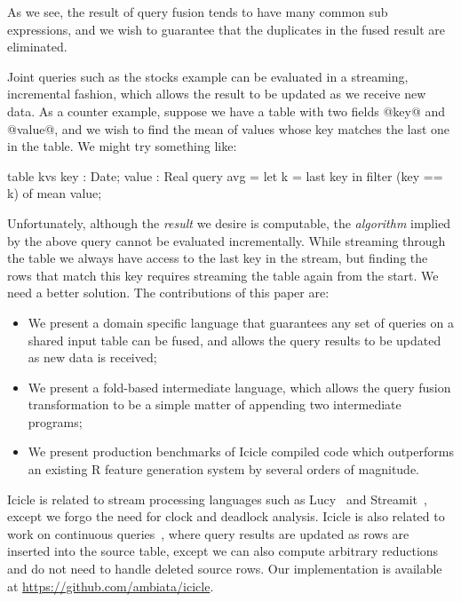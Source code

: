 As we see, the result of query fusion tends to have many common sub expressions, and we wish to guarantee that the duplicates in the fused result are eliminated.

Joint queries such as the stocks example can be evaluated in a streaming, incremental fashion, which allows the result to be updated as we receive new data. As a counter example, suppose we have a table with two fields @key@ and @value@, and we wish to find the mean of values whose key matches the last one in the table. We might try something like:
\begin{code}
  table kvs { key : Date; value : Real }
  query avg = let k = last key
              in  filter (key == k) of mean value;
\end{code}

Unfortunately, although the \emph{result} we desire is computable, the \emph{algorithm} implied by the above query cannot be evaluated incrementally. While streaming through the table we always have access to the last key in the stream, but finding the rows that match this key requires streaming the table again from the start. We need a better solution. The contributions of this paper are:
\begin{itemize}
\item
We present a domain specific language that guarantees any set of queries on a shared input table can be fused, and allows the query results to be updated as new data is received;

\item
We present a fold-based intermediate language, which allows the query fusion transformation to be a simple matter of appending two intermediate programs;

\item
We present production benchmarks of Icicle compiled code which outperforms an existing R feature generation system by several orders of magnitude. 
\end{itemize}


Icicle is related to stream processing languages such as Lucy~\cite{mandel2010lucy} and Streamit~\cite{thies2002streamit}, except we forgo the need for clock and deadlock analysis. Icicle is also related to work on continuous queries~\cite{arasu2003cql}, where query results are updated as rows are inserted into the source table, except we can also compute arbitrary reductions and do not need to handle deleted source rows. Our implementation is available at \url{https://github.com/ambiata/icicle}.
